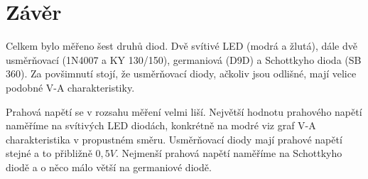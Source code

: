 \documentclass[12pt]{article} %
\begin{document}
\section{Závěr}
Celkem bylo měřeno šest druhů diod. Dvě svítivé LED (modrá a žlutá), dále dvě usměrňovací (1N4007 a KY 130/150), germaniová (D9D) a Schottkyho dioda (SB 360). Za povšimnutí stojí, že usměrňovací diody, ačkoliv jsou odlišné, mají velice podobné V-A charakteristiky.

Prahová napětí se v rozsahu měření velmi liší. Největší hodnotu prahového napětí naměříme na svítivých LED diodách, konkrétně na modré viz graf V-A charakteristika v propustném směru. Usměrňovací diody mají prahové napětí stejné a to přibližně $0,5V$. Nejmenší prahová napětí naměříme na Schottkyho diodě a o něco málo větší na germaniové diodě.
\end{document}
